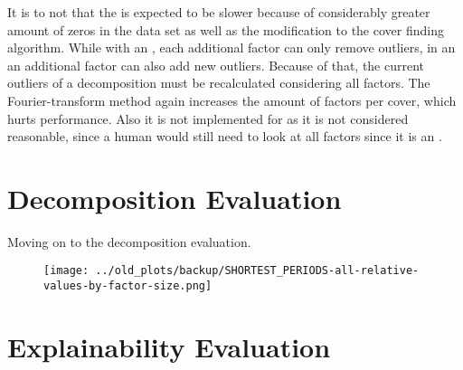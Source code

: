 It is to not that the \andDecomp is expected to be slower because of considerably greater amount of zeros in the data set as well as the modification to the cover finding algorithm. While with an \orDecomp, each additional factor can only remove outliers, in an \andDecomp an additional factor can also add new outliers. Because of that, the current outliers of a decomposition must be recalculated considering all factors. The Fourier-transform method again increases the amount of factors per cover, which hurts performance. Also it is not implemented for \andDecomp as it is not considered reasonable, since a human would still need to look at all factors since it is an \andDecomp.

\section{Decomposition Evaluation}
Moving on to the decomposition evaluation.

\begin{figure}[h]
	\texttt{[image: ../old\_plots/backup/SHORTEST\_PERIODS-all-relative-values-by-factor-size.png]}
\end{figure}
\begin{figure}
\end{figure}


\section{Explainability Evaluation}


